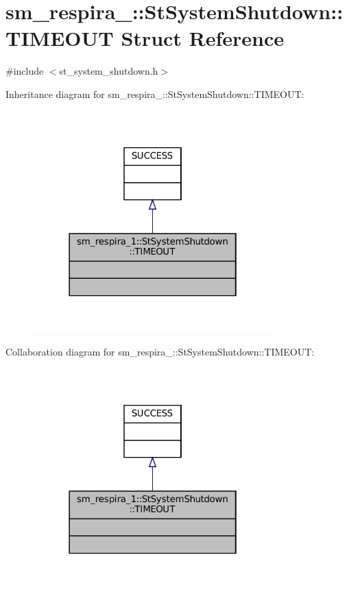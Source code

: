 \hypertarget{structsm__respira__1_1_1StSystemShutdown_1_1TIMEOUT}{}\section{sm\+\_\+respira\+\_\+:\+:St\+System\+Shutdown\+:\+:T\+I\+M\+E\+O\+UT Struct Reference}
\label{structsm__respira__1_1_1StSystemShutdown_1_1TIMEOUT}


{\ttfamily \#include $<$st\+\_\+system\+\_\+shutdown.\+h$>$}



Inheritance diagram for sm\+\_\+respira\+\_\+:\+:St\+System\+Shutdown\+:\+:T\+I\+M\+E\+O\+UT\+:
\nopagebreak
\begin{figure}[H]
\begin{center}
\leavevmode
\includegraphics[width=262pt]{structsm__respira__1_1_1StSystemShutdown_1_1TIMEOUT__inherit__graph}
\end{center}
\end{figure}


Collaboration diagram for sm\+\_\+respira\+\_\+:\+:St\+System\+Shutdown\+:\+:T\+I\+M\+E\+O\+UT\+:
\nopagebreak
\begin{figure}[H]
\begin{center}
\leavevmode
\includegraphics[width=262pt]{structsm__respira__1_1_1StSystemShutdown_1_1TIMEOUT__coll__graph}
\end{center}
\end{figure}


